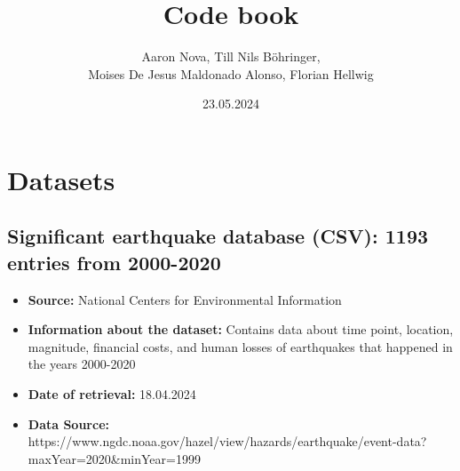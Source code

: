 \documentclass{article}
\title{Code book}
\author{Aaron Nova, Till Nils Böhringer, \\ 
Moises De Jesus Maldonado Alonso, Florian Hellwig}
\date{23.05.2024}
\begin{document}
\maketitle

\section{Datasets}

\subsection{Significant earthquake database (CSV): 1193 entries from 2000-2020}
\begin{itemize}
\item \textbf{Source:} National Centers for
Environmental Information
\item \textbf{Information about the dataset:} Contains data about time point, location, magnitude, financial costs, and human losses of earthquakes that happened in the years 2000-2020
\item \textbf{Date of retrieval:} 18.04.2024
\item \textbf{Data Source:} https://www.ngdc.noaa.gov/hazel/view/hazards/earthquake/event-data?maxYear=2020\&minYear=1999
\end{itemize}

\end{document}

